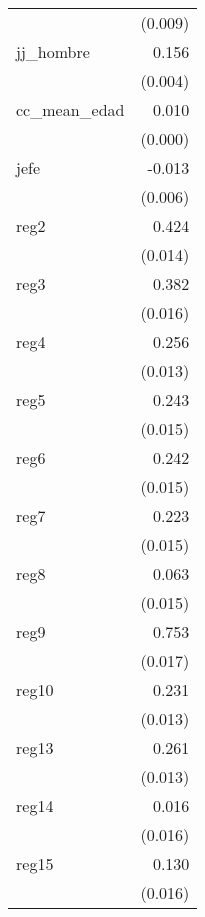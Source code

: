 {\begin{longtable}{l*{1}{D{.}{.}{-1}}}
            &     (0.009)         \\
\addlinespace
jj\_hombre   &       0.156\sym{***}\\
            &     (0.004)         \\
\addlinespace
cc\_mean\_edad&       0.010\sym{***}\\
            &     (0.000)         \\
\addlinespace
jefe        &      -0.013\sym{*}  \\
            &     (0.006)         \\
\addlinespace
reg2        &       0.424\sym{***}\\
            &     (0.014)         \\
\addlinespace
reg3        &       0.382\sym{***}\\
            &     (0.016)         \\
\addlinespace
reg4        &       0.256\sym{***}\\
            &     (0.013)         \\
\addlinespace
reg5        &       0.243\sym{***}\\
            &     (0.015)         \\
\addlinespace
reg6        &       0.242\sym{***}\\
            &     (0.015)         \\
\addlinespace
reg7        &       0.223\sym{***}\\
            &     (0.015)         \\
\addlinespace
reg8        &       0.063\sym{***}\\
            &     (0.015)         \\
\addlinespace
reg9        &       0.753\sym{***}\\
            &     (0.017)         \\
\addlinespace
reg10       &       0.231\sym{***}\\
            &     (0.013)         \\
\addlinespace
reg13       &       0.261\sym{***}\\
            &     (0.013)         \\
\addlinespace
reg14       &       0.016         \\
            &     (0.016)         \\
\addlinespace
reg15       &       0.130\sym{***}\\
            &     (0.016)         \\

\end{longtable}}
